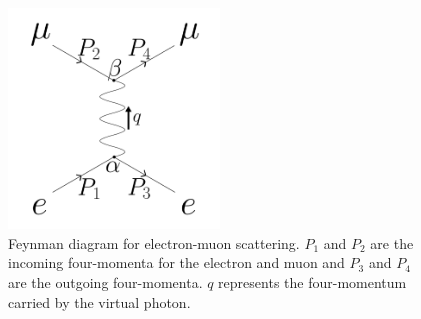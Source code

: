 \begin{figure}
  \centering
    \includegraphics[width=0.5\textwidth]{Figures/MottFeynman} 
  \caption[Feynman diagram for electron-muon scattering.]{Feynman diagram for electron-muon scattering. $P_1$ and $P_2$ are the incoming four-momenta for the electron and muon and $P_3$ and $P_4$ are the outgoing four-momenta. $q$ represents the four-momentum carried by the virtual photon.}
  \label{fig:mottFeynman}
\end{figure}

